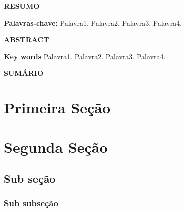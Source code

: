 \documentclass[12pt,a4paper]{article}
\begin{document}
\begin{titlepage}
    \centering
    \singlespacing
    \vspace*{3\baselineskip}

    \textbf{\Large RESUMO}

    \vspace{3\baselineskip}

    \singlespacing
    \lipsum[1] %
    \par

    \vspace{2\baselineskip}

    \textbf{Palavras-chave:} Palavra1. Palavra2. Palavra3. Palavra4.

\end{titlepage}

\begin{titlepage}
    \centering
    \singlespacing
    \vspace*{3\baselineskip}

    \textbf{\Large ABSTRACT}

    \vspace{3\baselineskip}

    \singlespacing
    \lipsum[1] %
    \par

    \vspace{2\baselineskip}

    \textbf{Key words} Palavra1. Palavra2. Palavra3. Palavra4.

\end{titlepage}

\begin{center}
    \vspace*{3cm}
    \Large\textbf{\MakeUppercase{Sumário}}
\end{center}
\vspace*{3\baselineskip}

\tableofcontents
\thispagestyle{empty}
\newpage

\setlength{\parindent}{1.25cm} %
\onehalfspacing %

\section{Primeira Seção}

\lipsum[1-2]

\section{Segunda Seção}

\lipsum[3-4]

\subsection{Sub seção}
\lipsum[5-6]

\subsubsection{Sub subseção}
\lipsum[5-6]
\end{document}
